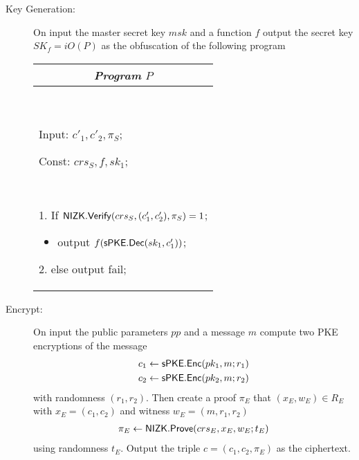\documentclass{llncs}
\begin{document}
\begin{description}
	
\item[Key Generation:] On input the master secret key $msk$ and a function $f$ output the secret key $SK_f = iO(P)$ as the obfuscation of the following program

\begin{center}
\begin{small}
    \begin{tabular}{| p{6cm} |}
	\hline
	\multicolumn{1}{|c|}{\textbf{\emph{Program} $P$}} \\
	\hline 
	\
	
	Input: $c'_1,c'_2,\pi_S$; 
	
	Const: $crs_S,f,sk_1$;
	
	\

	1. If $\mathsf{NIZK}.\mathsf{Verify}(crs_S,(c'_1,c'_2),\pi_S) = 1$;
	\begin{itemize}
		\item[] output $f(\mathsf{sPKE}.\mathsf{Dec}(sk_1,c'_1))$;
	\end{itemize}

	2. else output fail;

	\\
	\hline
	\end{tabular}
\end{small}
\end{center}


\item[Encrypt:] On input the public parameters $pp$ and a message $m$ compute two PKE encryptions of the message
	\begin{align*}
		c_1 &\gets \mathsf{sPKE}.\mathsf{Enc}(pk_1,m;r_1) \\
		c_2 &\gets \mathsf{sPKE}.\mathsf{Enc}(pk_2,m;r_2)
	\end{align*}
	with randomness $(r_1,r_2)$.	Then create a proof $\pi_E$ that $(x_E,w_E) \in R_E$ with $x_E = (c_1,c_2)$ and witness $w_E = (m,r_1,r_2)$ 
	\begin{align*}
		\pi_E \gets \mathsf{NIZK}.\mathsf{Prove}(crs_E,x_E,w_E;t_E)
	\end{align*}
	using randomness $t_E$. 
	Output the triple $c = (c_1,c_2,\pi_E)$ as the ciphertext.



\end{description}
\end{document}
